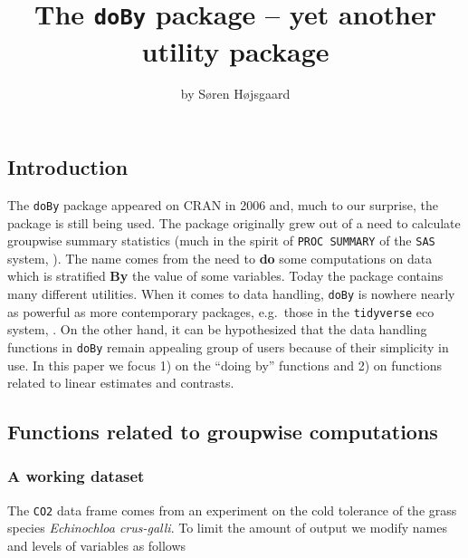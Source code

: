 \title{The \texttt{doBy} package -- yet another utility package}
\author{by Søren Højsgaard}

\maketitle


\hypertarget{introduction}{%
\subsection{Introduction}\label{introduction}}

The \texttt{doBy} package \citep{doby} appeared on CRAN in 2006 and,
much to our surprise, the package is still being used. The package
originally grew out of a need to calculate groupwise summary statistics
(much in the spirit of \texttt{PROC\ SUMMARY} of the \texttt{SAS}
system, \citep{procsummary}). The name comes from the need to
\textbf{do} some computations on data which is stratified \textbf{By}
the value of some variables. Today the package contains many different
utilities. When it comes to data handling, \texttt{doBy} is nowhere
nearly as powerful as more contemporary packages, e.g.~those in the
\texttt{tidyverse} eco system, \citep{tidyverse}. On the other hand, it
can be hypothesized that the data handling functions in \texttt{doBy}
remain appealing group of users because of their simplicity in use. In
this paper we focus 1) on the ``doing by'' functions and 2) on functions
related to linear estimates and contrasts.

\hypertarget{functions-related-to-groupwise-computations}{%
\subsection{Functions related to groupwise
computations}\label{functions-related-to-groupwise-computations}}

\hypertarget{a-working-dataset}{%
\subsubsection{A working dataset}\label{a-working-dataset}}

The \texttt{CO2} data frame comes from an experiment on the cold
tolerance of the grass species \emph{Echinochloa crus-galli}. To limit
the amount of output we modify names and levels of variables as follows

